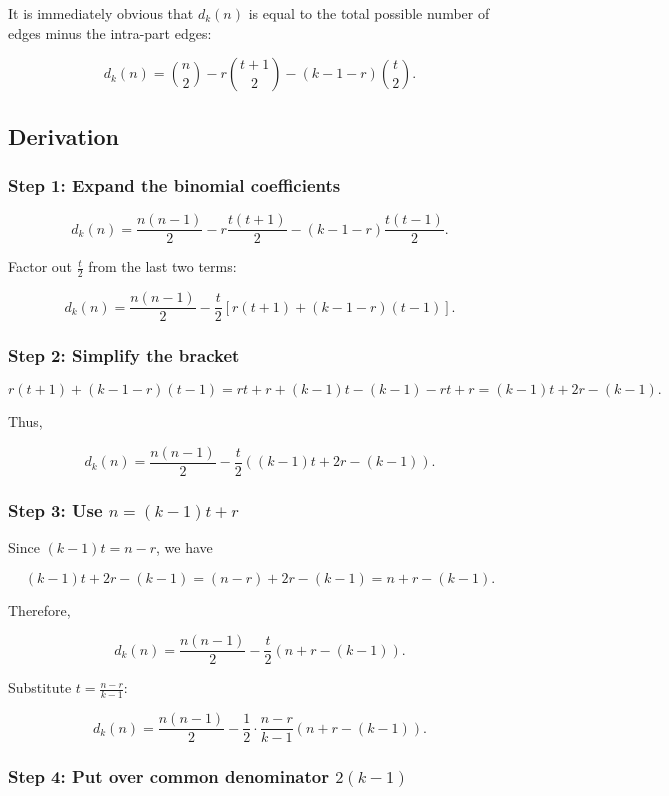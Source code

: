 \documentclass[11pt]{article}
\begin{document}
It is immediately obvious that $d_k(n)$ is equal to the total possible number of edges minus the intra-part edges:

\[
d_k(n)
=
\binom{n}{2}
-
r \binom{t+1}{2}
-
(k-1-r)\binom{t}{2}.
\]


\subsection{Derivation}


\subsubsection*{Step 1: Expand the binomial coefficients}

\[
d_k(n)
=
\frac{n(n-1)}{2}
-
r \frac{t(t+1)}{2}
-
(k-1-r)\frac{t(t-1)}{2}.
\]

Factor out $\frac{t}{2}$ from the last two terms:

\[
d_k(n)
=
\frac{n(n-1)}{2}
-
\frac{t}{2}
\left[
r(t+1)
+
(k-1-r)(t-1)
\right].
\]

\subsubsection*{Step 2: Simplify the bracket}

\[
r(t+1)
+
(k-1-r)(t-1)
=
rt + r
+
(k-1)t - (k-1) - rt + r
=
(k-1)t + 2r - (k-1).
\]

Thus,

\[
d_k(n)
=
\frac{n(n-1)}{2}
-
\frac{t}{2}
\left(
(k-1)t + 2r - (k-1)
\right).
\]

\subsubsection*{Step 3: Use $n=(k-1) t + r$}

Since $(k-1)t = n - r$, we have

\[
(k-1)t + 2r - (k-1)
=
(n-r) + 2r - (k-1)
=
n + r - (k-1).
\]

Therefore,

\[
d_k(n)
=
\frac{n(n-1)}{2}
-
\frac{t}{2}
(n+r-(k-1)).
\]

Substitute $t = \frac{n-r}{k-1}$:

\[
d_k(n)
=
\frac{n(n-1)}{2}
-
\frac{1}{2}
\cdot
\frac{n-r}{k-1}
(n+r-(k-1)).
\]

\subsubsection*{Step 4: Put over common denominator $2(k-1)$}
\end{document}
